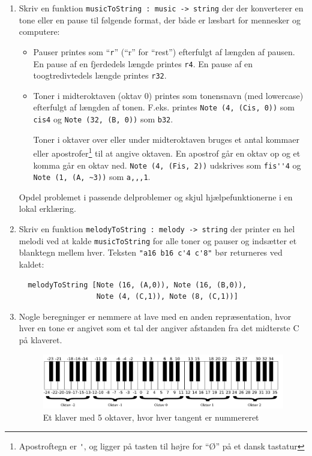 \documentclass[a4paper,12pt]{article}
\begin{document}
\begin{enumerate}[{4G}1]
\item Skriv en funktion \lstinline{musicToString : music -> string}
  der der konverterer en tone eller en pause til følgende format, der
  både er læsbart for mennesker og computere:

  \begin{itemize}
  \item Pauser printes som "`\lstinline{r}"' ("`r"' for
    "`rest"') efterfulgt af længden af pausen. En pause af en
    fjerdedels længde printes \lstinline{r4}. En pause af en
    toogtredivtedels længde printes \lstinline{r32}.
  \item Toner i midteroktaven (oktav 0) printes som tonensnavn (med
    lowercase) efterfulgt af længden af tonen. F.eks. printes
    \lstinline{Note (4, (Cis, 0))} som \lstinline{cis4} og
    \lstinline{Note (32, (B, 0))} som \lstinline{b32}.

    Toner i oktaver over eller under midteroktaven bruges et antal
    kommaer eller apostrofer\footnote{Apostroftegn er \lstinline{'},
      og ligger på tasten til højre for "`Ø"' på et dansk tastatur}
    til at angive oktaven. En apostrof går en oktav op og et komma går
    en oktav ned. \lstinline{Note (4, (Fis, 2))} udskrives som
    \lstinline{fis''4} og \lstinline{Note (1, (A, ~3))} som \lstinline{a,,,1}. 
  \end{itemize}

  Opdel problemet i passende delproblemer og skjul hjælpefunktionerne
  i en lokal erklæring.

\item Skriv en funktion \lstinline{melodyToString : melody -> string} der
  printer en hel melodi ved at kalde \lstinline{musicToString} for
  alle toner og pauser og indsætter et blanktegn mellem hver. Teksten \lstinline{"a16 b16 c'4 c'8"} bør returneres ved kaldet:
\begin{lstlisting}
  melodyToString [Note (16, (A,0)), Note (16, (B,0)),
                  Note (4, (C,1)), Note (8, (C,1))]
\end{lstlisting}

\item Nogle beregninger er nemmere at lave med en anden
  repræsentation, hvor hver en tone er angivet som et tal der angiver
  afstanden fra det midterste C på klaveret. 

\begin{figure}
  \centering
  \includegraphics[width=\textwidth]{uge4_5oktaver_nummereret.pdf}
  \caption{Et klaver med 5 oktaver, hvor hver tangent er nummereret}
  \label{fig:oktav}
\end{figure}



\end{enumerate}
\end{document}
